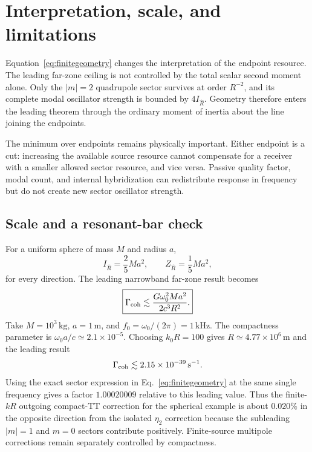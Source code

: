 \section{Interpretation, scale, and limitations}
\label{sec:interpretation}

Equation~\eqref{eq:finitegeometry} changes the interpretation of the endpoint resource. The leading far-zone ceiling is not controlled by the total scalar second moment alone. Only the $|m|=2$ quadrupole sector survives at order $R^{-2}$, and its complete modal oscillator strength is bounded by $4I_{\hat R}$. Geometry therefore enters the leading theorem through the ordinary moment of inertia about the line joining the endpoints.

The minimum over endpoints remains physically important. Either endpoint is a cut: increasing the available source resource cannot compensate for a receiver with a smaller allowed sector resource, and vice versa. Passive quality factor, modal count, and internal hybridization can redistribute response in frequency but do not create new sector oscillator strength.

\subsection{Scale and a resonant-bar check}

For a uniform sphere of mass $M$ and radius $a$,
\begin{equation}
I_{\hat R}=\frac25Ma^2,\qquad
Z_{\hat R}=\frac15Ma^2,
\end{equation}
for every direction. The leading narrowband far-zone result becomes
\begin{equation}
\boxed{
\Gamma_{\rm coh}
\lesssim
\frac{G\omega_0^2Ma^2}{2c^3R^2}.
}
\label{eq:spherebound}
\end{equation}
Take $M=10^3\,\mathrm{kg}$, $a=1\,\mathrm{m}$, and $f_0=\omega_0/(2\pi)=1\,\mathrm{kHz}$. The compactness parameter is $\omega_0a/c\simeq2.1\times10^{-5}$. Choosing $k_0R=100$ gives $R\simeq4.77\times10^6\,\mathrm{m}$ and the leading result
\begin{equation}
\Gamma_{\rm coh}\lesssim2.15\times10^{-39}\,\mathrm{s}^{-1}.
\end{equation}
Using the exact sector expression in Eq.~\eqref{eq:finitegeometry} at the same single frequency gives a factor $1.00020009$ relative to this leading value. Thus the finite-$kR$ outgoing compact-TT correction for the spherical example is about $0.020\%$ in the opposite direction from the isolated $\eta_2$ correction because the subleading $|m|=1$ and $m=0$ sectors contribute positively. Finite-source multipole corrections remain separately controlled by compactness.

